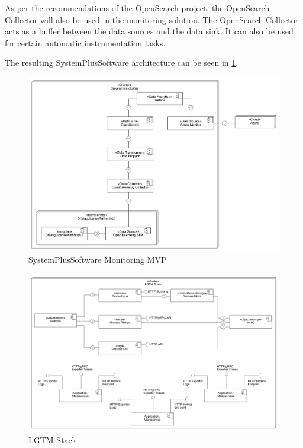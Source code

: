 As per the recommendations of the OpenSearch project, the OpenSearch Collector will also be used
in the monitoring solution. The OpenSearch Collector acts as a buffer between the data sources
and the data sink. It can also be used for certain automatic instrumentation tasks.

The resulting SystemPlusSoftware architecture can be seen in \ref{fig:sps_monitoring_mvp}.

\begin{figure}[h]
	\centering
	\includegraphics[width=\textwidth]{figures/sps_monitoring_mvp.png}
	\caption{SystemPlusSoftware Monitoring MVP}
	\label{fig:sps_monitoring_mvp}
\end{figure}

\begin{figure}[h]
	\centering
	\includegraphics[width=\textwidth]{figures/lgtm_stack.png}
	\caption{LGTM Stack}
	\label{fig:lgtm_stack}
\end{figure}